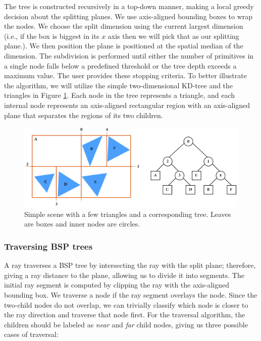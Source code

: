 \documentclass[a4paper,11pt,oneside]{article}
\begin{document}
The tree is constructed recursively in a top-down manner, making a local greedy decision about the splitting planes. We use axis-aligned bounding boxes to wrap the nodes. We choose the split dimension using the current largest dimension (i.e., if the box is biggest in its $x$ axis then we will pick that as our splitting plane.). We then position the plane is positioned at the spatial median of the dimension. The subdivision is performed until either the number of primitives in a single node falls below a predefined threshold or the tree depth exceeds a maximum value.  The user provides these stopping criteria. To better illustrate the algorithm, we will utilize the simple two-dimensional KD-tree and the triangles in Figure \ref{sec4.3:example-kd-tree}. Each node in the tree represents a triangle, and each internal node represents an axis-aligned rectangular region with an axis-aligned plane that separates the regions of its two children.

\begin{figure}[ht]
	\begin{center}
		\includegraphics[width=\textwidth]{section4/4.3/bsp-tree-example.png}
	\end{center}
	\caption{Simple scene with a few triangles and a corresponding tree. Leaves are boxes and inner nodes are circles.}
	\label{sec4.3:example-kd-tree}
\end{figure}

\subsubsection{Traversing BSP trees}

A ray traverses a BSP tree by intersecting the ray with the split plane; therefore, giving a ray distance to the plane, allowing us to divide it into segments. The initial ray segment is computed by clipping the ray with the axis-aligned bounding box. We traverse a node if the ray segment overlays the node. Since the two-child nodes do not overlap, we can trivially classify which node is closer to the ray direction and traverse that node first. For the traversal algorithm, the children should be labeled as \textit{near} and \textit{far} child nodes, giving us three possible cases of traversal:
\end{document}

